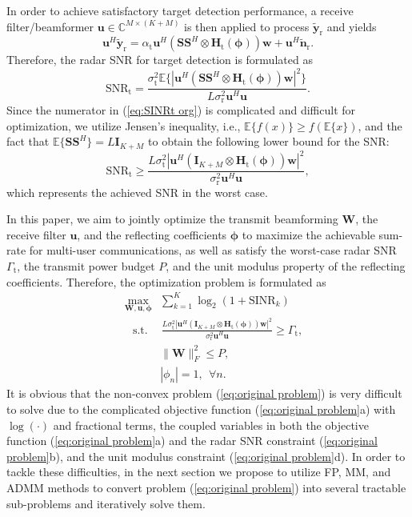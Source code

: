 \documentclass[Conference,a4paper]{IEEEtran}
\newcommand{\be}{\begin{equation}}
\newcommand{\ee}{\end{equation}}
\begin{document}
In order to achieve satisfactory target detection performance, a receive filter/beamformer $\mathbf{u}\in\mathbb{C}^{M\times (K+M)}$ is then applied to process $\widetilde{\mathbf{y}}_\text{r}$ and yields\vspace{-0.1 cm}
\be
\mathbf{u}^H\widetilde{\mathbf{y}}_\text{r}  = \alpha_\text{t}\mathbf{u}^H(\mathbf{SS}^H\otimes\mathbf{H}_\text{t}(\bm{\phi}))\mathbf{w} + \mathbf{u}^H\widetilde{\mathbf{n}}_\text{r}.
\ee
Therefore, the radar SNR for target detection is formulated as\vspace{-0.1 cm}
\be\label{eq:SINRt org}
\text{SNR}_\text{t} = \frac{\sigma_\text{t}^2\mathbb{E}\big\{|\mathbf{u}^H(\mathbf{SS}^H\otimes\mathbf{H}_\text{t}(\bm{\phi}))\mathbf{w}|^2\big\}}
{L\sigma_\text{r}^2\mathbf{u}^H\mathbf{u}}.
\ee
Since the numerator in (\ref{eq:SINRt org}) is complicated and difficult for optimization, we utilize Jensen's inequality, i.e., $\mathbb{E}\{f(x)\} \geq f(\mathbb{E}\{x\})$, and the fact that $\mathbb{E}\{\mathbf{SS}^H\} = L\mathbf{I}_{K+M}$ to obtain the following lower bound for the SNR:\vspace{-0.1 cm}
\be\label{eq:SINRt}
\text{SNR}_\text{t} \geq \frac{L\sigma_\text{t}^2|\mathbf{u}^H(\mathbf{I}_{K+M}\otimes\mathbf{H}_\text{t}(\bm{\phi}))\mathbf{w}|^2}
{\sigma_\text{r}^2\mathbf{u}^H\mathbf{u}},
\ee
which represents the achieved SNR in the worst case.



In this paper, we aim to jointly optimize the transmit beamforming $\mathbf{W}$, the receive filter $\mathbf{u}$, and the reflecting coefficients $\bm{\phi}$ to maximize the achievable sum-rate for multi-user communications, as well as satisfy the worst-case radar SNR $\Gamma_\text{t}$, the transmit power budget $P$, and the unit modulus property of the reflecting coefficients.
Therefore, the optimization problem is formulated as\vspace{-0.15 cm}
\begin{subequations}\label{eq:original problem}\begin{align}
&\underset{\mathbf{W},\mathbf{u},\bm{\phi}}\max~~\sum_{k=1}^K\log_2(1+\text{SINR}_k)\\
&\quad\text{s.t.}\quad~\frac{L\sigma_\text{t}^2|\mathbf{u}^H(\mathbf{I}_{K+M}\otimes\mathbf{H}_\text{t}(\bm{\phi}))\mathbf{w}|^2}
{\sigma_\text{r}^2\mathbf{u}^H\mathbf{u}} \geq \Gamma_\text{t}, \\
&\quad\quad\quad~~\|\mathbf{W}\|_F^2 \leq P,\\
&\quad\quad\quad~~|\phi_n| = 1,~~\forall n.
\end{align}
\end{subequations}
It is obvious that the non-convex problem (\ref{eq:original problem}) is very difficult to solve due to the complicated objective function (\ref{eq:original problem}a) with $\log(\cdot)$ and fractional terms, the coupled variables in both the objective function (\ref{eq:original problem}a) and the radar SNR constraint (\ref{eq:original problem}b), and the unit modulus constraint (\ref{eq:original problem}d).
In order to tackle these difficulties, in the next section we propose to utilize FP, MM, and ADMM methods to convert problem (\ref{eq:original problem}) into several tractable sub-problems and iteratively solve them.
\end{document}
